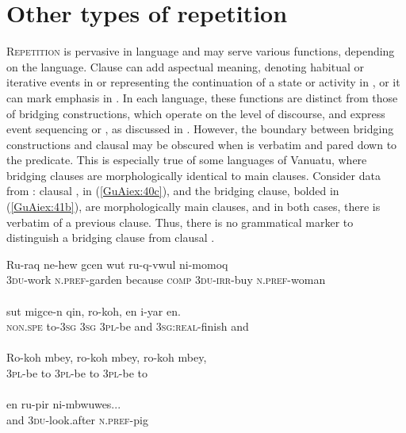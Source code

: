 \documentclass[output=paper]{LSP/langsci}
\begin{document}
\section{Other types of repetition}
\label{5otherRep}

\textsc{Repetition} is pervasive in language \citep{brown.2000} and may serve various functions, depending on the language. Clause  can add aspectual meaning, denoting habitual or iterative events in  \citep[][487]{besnier00} or representing the continuation of a state or activity in  \citep[259--260]{dimock09}, or it can mark emphasis in  \citep[][390]{schulze73}. In each language, these functions are distinct from those of bridging constructions, which operate on the level of discourse, and express event sequencing or , as discussed in . However, the boundary between bridging constructions and clausal  may be obscured when  is verbatim and pared down to the predicate. This is especially true of some  languages of Vanuatu, where bridging clauses are morphologically identical to main clauses. Consider data from : clausal , in (\ref{GuAiex:40c}), and the bridging clause, bolded in (\ref{GuAiex:41b}), are morphologically main clauses, and in both cases, there is verbatim  of a previous clause. Thus, there is no grammatical marker to distinguish a bridging clause from clausal . 


\begin{exe}
\ex \label{GuAiex:40ad}
\begin{xlist}
\ex \label{GuAiex:40a}
\gll Ru-raq   ne-hew   gcen     wut     ru-q-vwul   ni-momoq \\
\textsc{3du}-work   \textsc{n.pref}-garden because   \textsc{comp}     \textsc{3du-irr-}buy   \textsc{n.pref}-woman \\
\glt {} \\
\ex \label{GuAiex:40b}
\gll sut    migce-n   qin,   ro-koh,    en   i-yar       en. \\
\textsc{non.spe}  to-\textsc{3sg}     \textsc{3sg}   \textsc{3pl}-be    and   \textsc{3sg:real}-finish   and \\
\glt {}\\
\ex \label{GuAiex:40c}
\gll Ro-koh   mbey, ro-koh   mbey,  ro-koh   mbey, \\
\textsc{3pl}-be        to               \textsc{3pl}-be     to  \textsc{3pl}-be     to  \\
\glt {}\\
\ex \label{GuAiex:40d}
\gll en   ru-pir       ni-mbwuwes... \\
and   3\textsc{du}-look.after   \textsc{n.pref}-pig\\
\glt {}\\
\end{xlist}
\end{exe}
\end{document}
